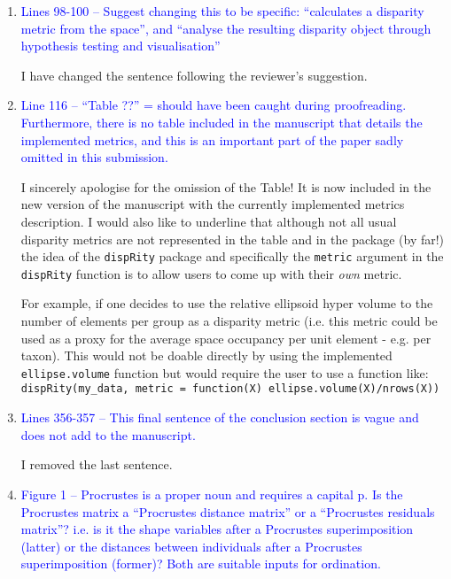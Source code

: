 \documentclass[12pt,letterpaper]{article}
\begin{document}
\begin{enumerate}
\item{\textcolor{blue}{Lines 98-100 – Suggest changing this to be specific: “calculates a disparity metric from the space”, and “analyse the resulting disparity object through hypothesis testing and visualisation”}}

I have changed the sentence following the reviewer's suggestion.

\item{\textcolor{blue}{Line 116 – “Table ??” = should have been caught during proofreading. Furthermore, there is no table included in the manuscript that details the implemented metrics, and this is an important part of the paper sadly omitted in this submission.}}
\label{table_missing}

I sincerely apologise for the omission of the Table! It is now included in the new version of the manuscript with the currently implemented metrics description.
I would also like to underline that although not all usual disparity metrics are not represented in the table and in the package (by far!) the idea of the \texttt{dispRity} package and specifically the \texttt{metric} argument in the \texttt{dispRity} function is to allow users to come up with their \textit{own} metric.

For example, if one decides to use the relative ellipsoid hyper volume to the number of elements per group as a disparity metric (i.e. this metric could be used as a proxy for the average space occupancy per unit element - e.g. per taxon).
This would not be doable directly by using the implemented \texttt{ellipse.volume} function but would require the user to use a function like:\\
\texttt{dispRity(my\_data, metric = function(X) ellipse.volume(X)/nrows(X))}\\


\item{\textcolor{blue}{Lines 356-357 – This final sentence of the conclusion section is vague and does not add to the manuscript.}}
\label{remove_last_sentence}

I removed the last sentence.

\item{\textcolor{blue}{Figure 1 – Procrustes is a proper noun and requires a capital p. Is the Procrustes matrix a “Procrustes distance matrix” or a “Procrustes residuals matrix”? i.e. is it the shape variables after a Procrustes superimposition (latter) or the distances between individuals after a Procrustes superimposition (former)? Both are suitable inputs for ordination.}}


\end{enumerate}
\end{document}
